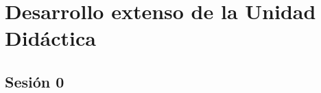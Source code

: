 \chapter{Desarrollo extenso de la Unidad Didáctica}


\label{app:todo}









\section{Sesión 0}


